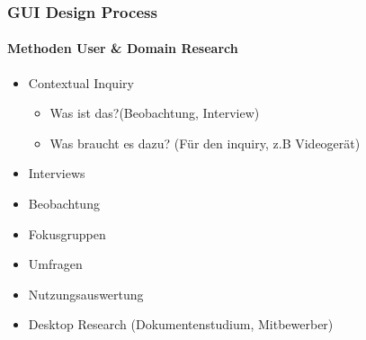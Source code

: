 \documentclass[../ZF_SWEN1.tex]{subfiles}
\begin{document}
\subsubsection{GUI Design Process}
\paragraph{Methoden User \& Domain Research}
\begin{itemize}
	\item Contextual Inquiry
	\begin{itemize}
		\item Was ist das?(Beobachtung, Interview)
		\item Was braucht es dazu? (Für den inquiry, z.B Videogerät)
	\end{itemize}
	\item Interviews
	\item Beobachtung
	\item Fokusgruppen
	\item Umfragen
	\item Nutzungsauswertung
	\item Desktop Research (Dokumentenstudium, Mitbewerber)
\end{itemize}
\end{document}
